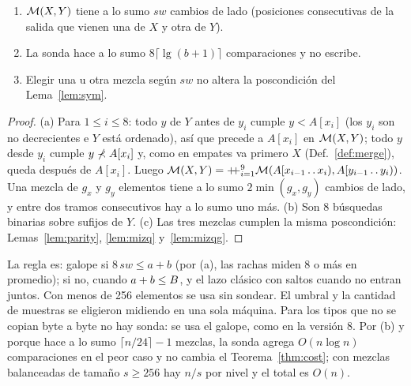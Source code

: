 \begin{lema}\label{lem:sonda}
\begin{enumerate}[label=(\alph*),nosep]
\item $\mathcal{M}(X,Y)$ tiene a lo sumo $\mathit{sw}$ cambios de lado (posiciones consecutivas
  de la salida que vienen una de $X$ y otra de $Y$).
\item La sonda hace a lo sumo $8\lceil\lg(b+1)\rceil$ comparaciones y no escribe.
\item Elegir una u otra mezcla según $\mathit{sw}$ no altera la poscondición del
  Lema~\ref{lem:sym}.
\end{enumerate}
\end{lema}
\begin{proof}
(a) Para $1\le i\le8$: todo $y$ de $Y$ antes de $y_i$ cumple $y\lt A[x_i]$ (los $y_i$ son
no decrecientes e $Y$ está ordenado), así que precede a $A[x_i]$ en $\mathcal{M}(X,Y)$; todo $y$
desde $y_i$ cumple $y\not\prec A[x_i]$ y, como en empates va primero $X$
(Def.~\ref{def:merge}), queda después de $A[x_i]$. Luego
$\mathcal{M}(X,Y)=\mathbin{+\!\!+}_{i=1}^{9}\mathcal{M}(A[x_{i-1}\mathinner{.\,.}x_i),A[y_{i-1}\mathinner{.\,.}y_i))$. Una mezcla
de $g_x$ y $g_y$ elementos tiene a lo sumo $2\min(g_x,g_y)$ cambios de lado, y entre dos
tramos consecutivos hay a lo sumo uno más.
(b) Son 8 búsquedas binarias sobre sufijos de $Y$.
(c) Las tres mezclas cumplen la misma poscondición: Lemas~\ref{lem:parity},
\ref{lem:mizq} y~\ref{lem:mizqg}.
\end{proof}

La regla es: galope si $8\,\mathit{sw}\le a+b$ (por (a), las rachas miden 8 o más en
promedio); si no, \Parity cuando $a+b\le B$, y el lazo clásico con saltos cuando no
entran juntos. Con menos de 256 elementos se usa \Parity sin sondear. El umbral y la
cantidad de muestras se eligieron midiendo en una sola máquina. Para los tipos que no se
copian byte a byte no hay sonda: se usa el galope, como en la versión 8. Por (b) y
porque \Natural hace a lo sumo $\lceil n/24\rceil-1$ mezclas, la sonda agrega
$O(n\log n)$ comparaciones en el peor caso y no cambia el Teorema~\ref{thm:cost}; con
mezclas balanceadas de tamaño $s\ge256$ hay $n/s$ por nivel y el total es $O(n)$.

